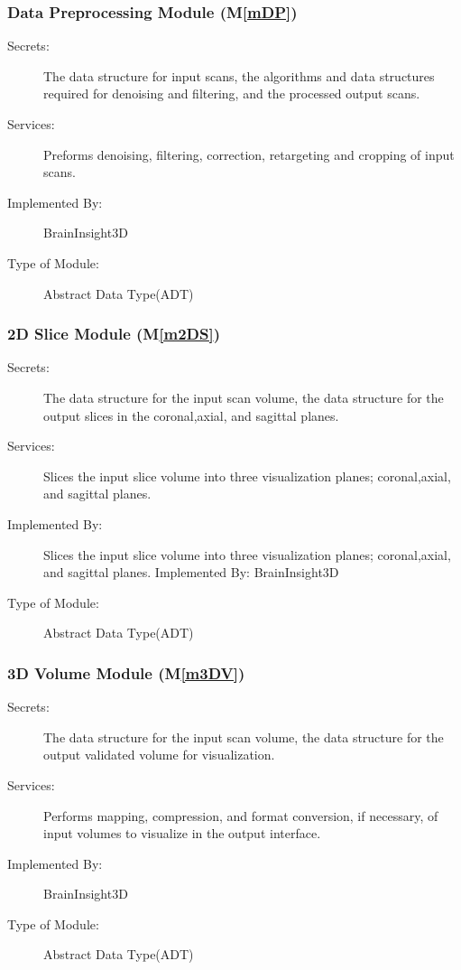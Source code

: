 \documentclass[12pt, titlepage]{article}
\newcommand{\mref}[1]{M\ref{#1}}
\begin{document}
\subsubsection{Data Preprocessing Module (\mref{mDP})}

\begin{description}
  \item[Secrets:]The data structure for input scans, the algorithms and data structures required for denoising and filtering, and the processed output scans.
  \item[Services:] Preforms denoising, filtering, correction, retargeting and cropping of input scans.

  \item[Implemented By:] BrainInsight3D
  \item[Type of Module:] Abstract Data Type(ADT)
\end{description}




\subsubsection{2D Slice Module (\mref{m2DS})}

\begin{description}
  \item[Secrets:]The data structure for the input scan volume, the data structure for the output slices in the coronal,axial, and sagittal planes.

  \item[Services:]Slices the input slice volume into three visualization planes; coronal,axial, and sagittal planes.

  \item[Implemented By:]  Slices the input slice volume into three visualization planes; coronal,axial, and sagittal planes.
        Implemented By: BrainInsight3D
  \item[Type of Module:] Abstract Data Type(ADT)
\end{description}



\subsubsection{3D Volume Module (\mref{m3DV})}

\begin{description}
  \item[Secrets:] The data structure for the input scan volume, the data structure for the output validated volume for visualization.

  \item[Services:] Performs mapping, compression, and format conversion, if necessary, of input volumes to visualize in the output interface.

  \item[Implemented By:] BrainInsight3D
  \item[Type of Module:] Abstract Data Type(ADT)
\end{description}
\end{document}
